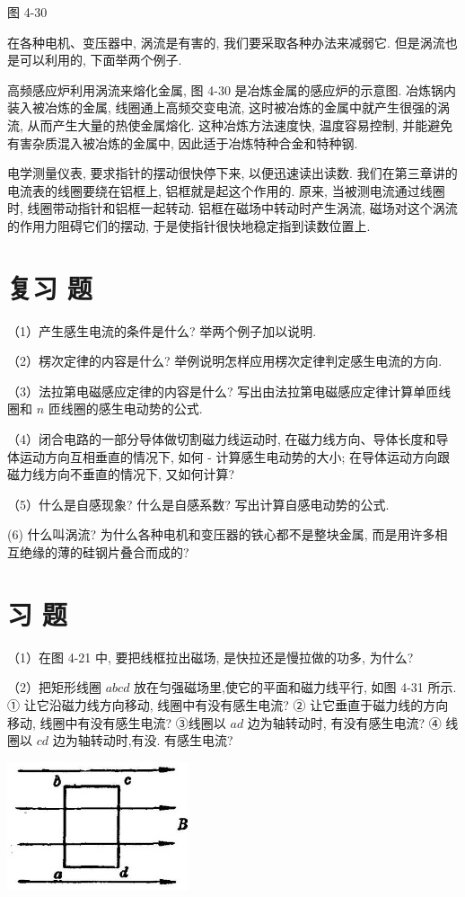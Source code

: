 \documentclass[10pt]{article}
\begin{document}
图 4-30

在各种电机、变压器中, 涡流是有害的, 我们要采取各种办法来减弱它. 但是涡流也是可以利用的, 下面举两个例子.

高频感应炉利用涡流来熔化金属, 图 4-30 是冶炼金属的感应炉的示意图. 冶炼锅内装入被冶炼的金属, 线圈通上高频交变电流, 这时被冶炼的金属中就产生很强的涡流, 从而产生大量的热使金属熔化. 这种冶炼方法速度快, 温度容易控制, 并能避免有害杂质混入被冶炼的金属中, 因此适于冶炼特种合金和特种钢.

电学测量仪表, 要求指针的摆动很快停下来, 以便迅速读出读数. 我们在第三章讲的电流表的线圈要绕在铝框上, 铝框就是起这个作用的. 原来, 当被测电流通过线圈时, 线圈带动指针和铝框一起转动. 铝框在磁场中转动时产生涡流, 磁场对这个涡流的作用力阻碍它们的摆动, 于是使指针很快地稳定指到读数位置上.

\section*{复习 题}

（1）产生感生电流的条件是什么? 举两个例子加以说明.

（2）楞次定律的内容是什么? 举例说明怎样应用楞次定律判定感生电流的方向.

（3）法拉第电磁感应定律的内容是什么? 写出由法拉第电磁感应定律计算单匝线圈和 \(n\) 匝线圈的感生电动势的公式.

（4）闭合电路的一部分导体做切割磁力线运动时, 在磁力线方向、导体长度和导体运动方向互相垂直的情况下, 如何 - 计算感生电动势的大小; 在导体运动方向跟磁力线方向不垂直的情况下, 又如何计算?

（5）什么是自感现象? 什么是自感系数? 写出计算自感电动势的公式.

(6) 什么叫涡流? 为什么各种电机和变压器的铁心都不是整块金属, 而是用许多相互绝缘的薄的硅钢片叠合而成的?

\section*{习 题}

（1）在图 4-21 中, 要把线框拉出磁场, 是快拉还是慢拉做的功多, 为什么?

（2）把矩形线圈 \({abcd}\) 放在匀强磁场里,使它的平面和磁力线平行, 如图 4-31 所示. ① 让它沿磁力线方向移动, 线圈中有没有感生电流? ② 让它垂直于磁力线的方向移动, 线圈中有没有感生电流? ③线圈以 \({ad}\) 边为轴转动时, 有没有感生电流? ④ 线圈以 \({cd}\) 边为轴转动时,有没. 有感生电流?

\begin{center}
\includegraphics[max width=0.4\textwidth]{images/01913056-1f15-74d8-9184-9aab52c9d66b_155_866339.jpg}
\end{center}
\end{document}
